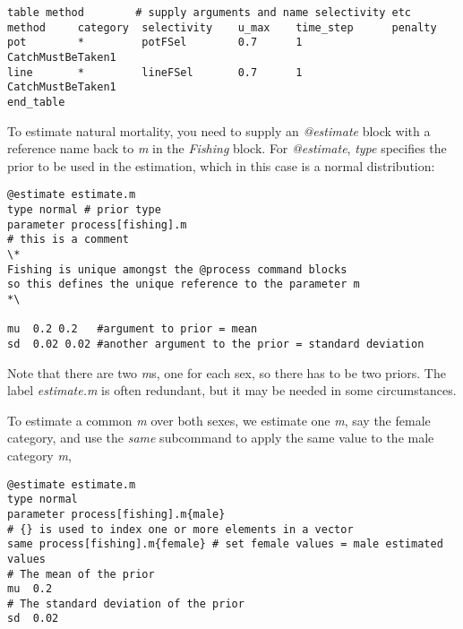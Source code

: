 {\small{\begin{verbatim}
table method        # supply arguments and name selectivity etc
method     category  selectivity    u_max    time_step      penalty
pot        *         potFSel        0.7      1              CatchMustBeTaken1
line       *         lineFSel       0.7      1              CatchMustBeTaken1
end_table
\end{verbatim}}}

To estimate natural mortality, you need to supply an \textit{@estimate} block with a reference name back to \textit{m} in the \textit{Fishing} block. For \textit{@estimate}, \textit{type} specifies the prior to be used in the estimation, which in this case is a normal distribution:

{\small{\begin{verbatim}
@estimate estimate.m
type normal # prior type
parameter process[fishing].m  
# this is a comment
\*
Fishing is unique amongst the @process command blocks
so this defines the unique reference to the parameter m
*\

mu  0.2 0.2   #argument to prior = mean
sd  0.02 0.02 #another argument to the prior = standard deviation
\end{verbatim}}}

Note that there are two \textit{m}s, one for each sex, so there has to be two priors. The \textit{\@estiamte} label \textit{estimate.m} is often redundant, but it may be needed in some circumstances.

To estimate a common \textit{m} over both sexes, we estimate one \textit{m}, say the female category, and use the \textit{same} subcommand to apply the same value to the male category \textit{m},

{\small{\begin{verbatim}
@estimate estimate.m
type normal
parameter process[fishing].m{male}
# {} is used to index one or more elements in a vector
same process[fishing].m{female} # set female values = male estimated values
# The mean of the prior
mu  0.2
# The standard deviation of the prior
sd  0.02
\end{verbatim}}}


\subsection{\label{sec:SingleStepping}}



